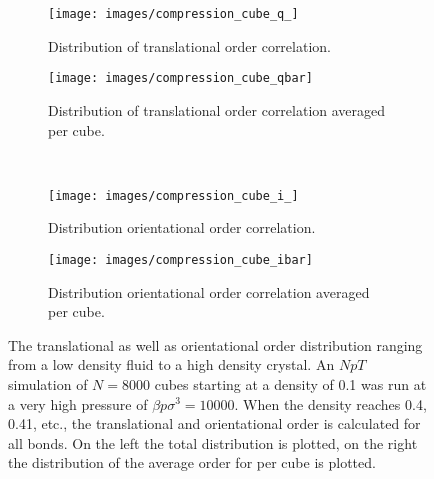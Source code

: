 \documentclass[thesis]{subfiles}
\begin{document}
\begin{figure}[h]
	\centering
	\begin{subfigure}{0.48\textwidth}
		\centering
		\texttt{[image: images/compression\_cube\_q\_]}
		\caption{Distribution of translational order correlation.}\label{fig:compression_cubea}
	\end{subfigure}
	\begin{subfigure}{0.51\textwidth}
		\centering
		\texttt{[image: images/compression\_cube\_qbar]}
		\caption{Distribution of translational order correlation averaged per cube.}\label{fig:compression_cubeb}
	\end{subfigure}\\\vspace{10pt}
	\begin{subfigure}{0.48\textwidth}
		\centering
		\texttt{[image: images/compression\_cube\_i\_]}
		\caption{Distribution orientational order correlation.}\label{fig:compression_cubec}
	\end{subfigure}
	\begin{subfigure}{0.51\textwidth}
		\centering
		\texttt{[image: images/compression\_cube\_ibar]}
		\caption{Distribution orientational order correlation averaged per cube.}\label{fig:compression_cubed}
	\end{subfigure}
	\caption{The translational as well as orientational order distribution ranging from a low density fluid to a high density crystal. %
	An $NpT$ simulation of $N = 8000$ cubes starting at a density of 0.1 was run at a very high pressure of $\beta p \sigma^3 = 10000$. When the density reaches 0.4, 0.41, etc., the translational and orientational order is calculated for all bonds. On the left the total distribution is plotted, on the right the distribution of the average order for per cube is plotted.}
	\label{fig:compression_cube}
\end{figure}
\end{document}
